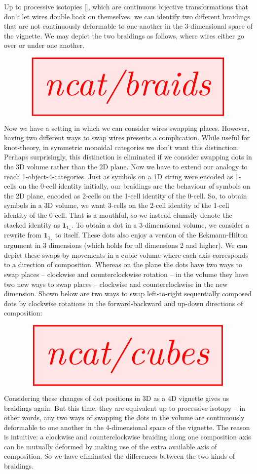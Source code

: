 Up to processive isotopies [], which are continuous bijective transformations that don't let wires double back on themselves, we can identify two different braidings that are not continuously deformable to one another in the 3-dimensional space of the vignette. We may depict the two braidings as follows, where wires either go over or under one another.

\[\resizebox{\textwidth}{!}{\tikzfig{ncat/braids}}\]

Now we have a setting in which we can consider wires swapping places. However, having two different ways to swap wires presents a complication. While useful for knot-theory, in symmetric monoidal categories we don't want this distinction. Perhaps surprisingly, this distinction is eliminated if we consider swapping dots in the 3D volume rather than the 2D plane. Now we have to extend our analogy to reach 1-object-4-categories. Just as symbols on a 1D string were encoded as 1-cells on the 0-cell identity initially, our braidings are the behaviour of symbols on the 2D plane, encoded as 2-cells on the 1-cell identity of the 0-cell. So, to obtain symbols in a 3D volume, we want 3-cells on the 2-cell identity of the 1-cell identity of the 0-cell. That is a mouthful, so we instead clumsily denote the stacked identity as $\textbf{1}_{\textbf{1}_\star}$. To obtain a dot in a 3-dimensional volume, we consider a rewrite from $\textbf{1}_{\textbf{1}_\star}$ to itself. These dots also enjoy a version of the Eckmann-Hilton argument in 3 dimensions (which holds for all dimensions 2 and higher). We can depict these swaps by movements in a cubic volume where each axis corresponds to a direction of composition. Whereas on the plane the dots have two ways to swap places -- clockwise and counterclockwise rotation -- in the volume they have two new ways to swap places -- clockwise and counterclockwise in the new dimension. Shown below are two ways to swap left-to-right sequentially composed dots by clockwise rotations in the forward-backward and up-down directions of composition:

\[\resizebox{\textwidth}{!}{\tikzfig{ncat/cubes}}\]

Considering these changes of dot positions in 3D as a 4D vignette gives us braidings again. But this time, they are equivalent up to processive isotopy -- in other words, any two ways of swapping the dots in the volume are continuously deformable to one another in the 4-dimensional space of the vignette. The reason is intuitive: a clockwise and counterclockwise braiding along one composition axis can be mutually deformed by making use of the extra available axis of composition. So we have eliminated the differences between the two kinds of braidings.\\

